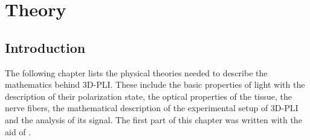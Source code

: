\cleardoublepage
\setcounter{chapter}{2}
\chapter{Theory}
\label{sec:theory}
%
%
\section{Introduction}
The following chapter lists the physical theories needed to describe the mathematics behind \ac{3D-PLI}.
These include the basic properties of light with the description of their polarization state, the optical properties of the tissue, \ie{} the nerve fibers, the mathematical description of the experimental setup of \ac{3D-PLI} and the analysis of its signal.
The first part of this chapter was written with the aid of \cite{demtroeder2, Fliebach2012}.
%
%
%
